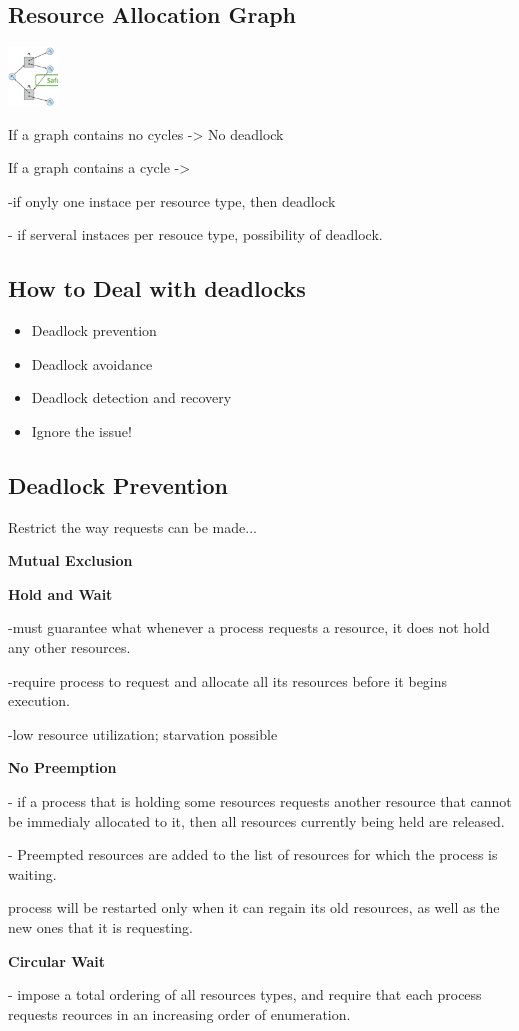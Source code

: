 \subsection{Resource Allocation Graph}

\includegraphics[width=0.1\textwidth]{ConcurrencyErrors/ressourcegraph.png}

If a graph contains no cycles -> No deadlock \par
If a graph contains a cycle -> \par
-if onyly one instace per resource type, then deadlock\par
- if serveral instaces per resouce type, possibility of deadlock.

\subsection{How to Deal with deadlocks}

\begin{itemize}
    \item Deadlock prevention
    \item Deadlock avoidance
    \item Deadlock detection and recovery
    \item Ignore the issue!
\end{itemize}

\subsection{Deadlock Prevention}

Restrict the way requests can be made...\par
\textbf{Mutual Exclusion}\par
\textbf{Hold and Wait}\par
-must guarantee what whenever a process requests a resource, it does not hold any other resources.\par
-require process to request and allocate all its resources before it begins execution.\par
-low resource utilization; starvation possible\par
\textbf{No Preemption} \par
- if a process that is holding some resources requests another resource that cannot be immedialy allocated to it, then all resources currently being held are released.\par
- Preempted resources are added to the list of resources for which the process is waiting.\par
 process will be restarted only when it can regain its old resources, as well as the new ones that it is requesting.\par
 \textbf{Circular Wait}\par
 - impose a total ordering of all resources types, and require that each process requests reources in an increasing order of enumeration.
 
